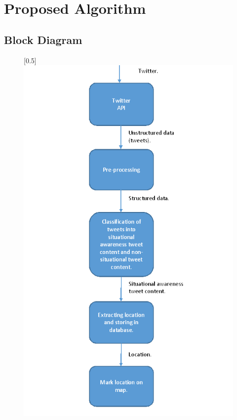 \documentclass[journal]{IEEEtran}
\begin{document}
\section{Proposed Algorithm}
\subsection{Block Diagram}
	\begin{center}
		\begin{figure}[H]
			\begin{mdframed}
			\scalebox{0.5}[0.5]{\includegraphics{BE-Block-Diagram}}
						\end{mdframed}
			\label{BlockDiagram}
		\end{figure}
	\end{center}
\end{document}
